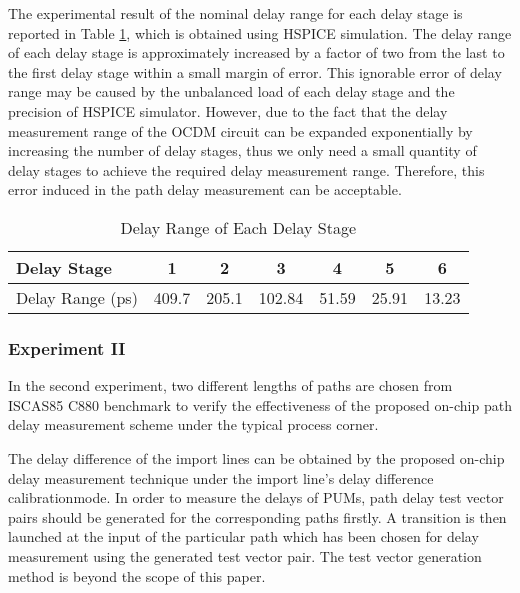 The experimental result of the nominal delay range for each delay stage is reported in Table \ref{tab:delay-range}, which is obtained using HSPICE simulation. The delay range of each delay stage is approximately increased by a factor of two from the last to the first delay stage within a small margin of error. This ignorable error of delay range may be caused by the unbalanced load of each delay stage and the precision of HSPICE simulator. However, due to the fact that the delay measurement range of the OCDM circuit can be expanded exponentially by increasing the number of delay stages, thus we only need a small quantity of delay stages to achieve the required delay measurement range. Therefore, this error induced in the path delay measurement can be acceptable.

\begin{table}[h]
\begin{center}
  \setlength{\tabcolsep}{3mm}
    \caption{Delay Range of Each Delay Stage} \label{tab:delay-range}
    \begin{tabular}{@{}lcccccc}
        \toprule
         Delay Stage & 1 & 2 & 3 & 4 & 5 & 6 \\ 
         \midrule
         Delay Range (ps) & 409.7 & 205.1 & 102.84 & 51.59 & 25.91 & 13.23 \\ 
         \bottomrule
    \end{tabular}
\end{center}
\end{table}

\subsubsection{Experiment II}
In the second experiment, two different lengths of paths are chosen from ISCAS85 C880 benchmark to verify the effectiveness of the proposed on-chip path delay measurement scheme under the typical process corner.

The delay difference of the import lines can be obtained by the proposed on-chip delay measurement technique under the import line’s delay difference calibrationmode. In order to measure the delays of PUMs, path delay test vector pairs should be generated for the corresponding paths firstly. A transition is then launched at the input of the particular path which has been chosen for delay measurement using the generated test vector pair. The test vector generation method is beyond the scope of this paper.


